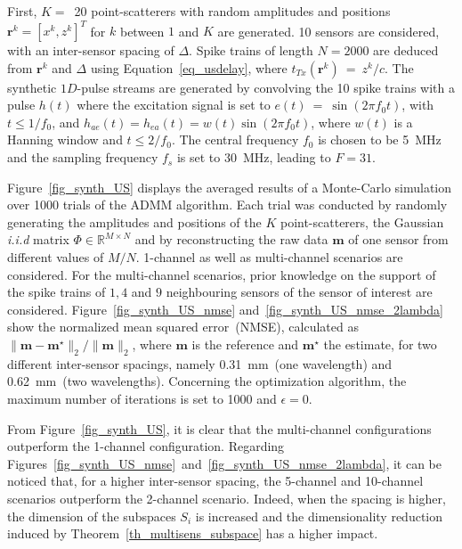 \documentclass[journal]{IEEEtran}
\newcommand{\vect}[1]{\bm{#1}}
\newcommand{\mat}[1]{\mathsf{#1}}
\theoremstyle{definition}
\begin{document}
First, $K=$~\num{20} point-scatterers with random amplitudes and positions $\vect{r}^k = \left[x^k, z^k\right]^T$ for $k$ between $1$ and $K$ are generated. \num{10} sensors are considered, with an inter-sensor spacing of $\Delta$. Spike trains of length $N = 2000$ are deduced from $\vect{r}^k$ and $\Delta$ using Equation~\eqref{eq_usdelay}, where $t_{Tx}\left(\vect{r}^k\right)~=~z^k /c$.
The synthetic $1D$-pulse streams are generated by convolving the \num{10} spike trains with a pulse $h\left(t\right)$ where the excitation signal is set to $e\left(t\right)~=~\sin \left(2 \pi f_0 t\right)$, with $t \leq 1/f_0$, and $h_{ae} \left(t\right) = h_{ea} \left(t\right) = w\left(t\right) \sin \left(2 \pi f_0 t\right)$, where $w\left(t\right)$ is a Hanning window and $t\leq2/f_0$. The central frequency $f_0$ is chosen to be \SI{5}{\mega\hertz} and the sampling frequency $f_s$ is set to \SI{30}{\mega\hertz}, leading to $F=31$.

Figure~\ref{fig_synth_US} displays the averaged results of a Monte-Carlo simulation over \num{1000} trials of the ADMM algorithm. Each trial was conducted by randomly generating the amplitudes and positions of the $K$ point-scatterers, the Gaussian \textit{i.i.d} matrix $\mat{\Phi} \in \mathbb{R}^{M \times N}$ and by reconstructing the raw data $\vect{m}$ of one sensor from different values of $M/N$. 1-channel as well as multi-channel scenarios are considered. For the multi-channel scenarios, prior knowledge on the support of the spike trains of $1, 4$ and $9$ neighbouring sensors of the sensor of interest are considered. Figure~\ref{fig_synth_US_nmse} and~\ref{fig_synth_US_nmse_2lambda} show the normalized mean squared error~(NMSE), calculated as $\| \vect{m} - \vect{m}^\star \|_2 / \| \vect{m}\|_2$, where $\vect{m}$ is the reference and $\vect{m}^\star$ the estimate, for two different inter-sensor spacings, namely \SI{0.31}{\milli\metre}~(one wavelength) and \SI{0.62}{\milli\metre}~(two wavelengths). Concerning the optimization algorithm, the maximum number of iterations is set to \num{1000} and $\epsilon = 0$. 

From Figure~\ref{fig_synth_US}, it is clear that the multi-channel configurations outperform the 1-channel configuration. Regarding Figures~\ref{fig_synth_US_nmse}~and~\ref{fig_synth_US_nmse_2lambda}, it can be noticed that, for a higher inter-sensor spacing, the \num{5}-channel and \num{10}-channel scenarios outperform the \num{2}-channel scenario. Indeed, when the spacing is higher, the dimension of the subspaces $S_i$ is increased and the dimensionality reduction induced by Theorem~\ref{th_multisens_subspace} has a higher impact.
\end{document}
